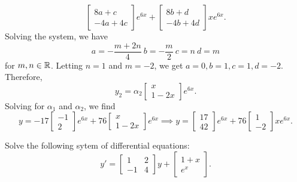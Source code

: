 \begin{example}
$$    \begin{bmatrix} 8a+c \\ -4a+4c \end{bmatrix}e^{6x} + \begin{bmatrix} 8b+d \\ -4b+4d \end{bmatrix}xe^{6x}.$$
    Solving the system, we have $$a=-\frac{m+2n}{4}~b=-\frac{m}{2}~c=n~d=m$$
    for $m,n \in \mathbb R$. Letting $n=1$ and $m=-2$, we get $a=0, b=1, c=1, d=-2$.
    Therefore, $$y_2 = \alpha_2 \begin{bmatrix} x \\ 1-2x \end{bmatrix}e^{6x}.$$
    Solving for $\alpha_1$ and $\alpha_2$, we find
    $$y = -17\begin{bmatrix} -1 \\ 2 \end{bmatrix}e^{6x}+76\begin{bmatrix} x \\ 1-2x \end{bmatrix}e^{6x}
    \implies y = \begin{bmatrix}17 \\42\end{bmatrix}e^{6x}+76\begin{bmatrix} 1\\ -2 \end{bmatrix}xe^{6x}.$$
\end{example}
\begin{exercise}
    Solve the following sytem of differential equations:
    $$y' = \begin{bmatrix} 1 & 2 \\ -1 & 4 \end{bmatrix}y + \begin{bmatrix} 1+x\\e^x \end{bmatrix}.$$
\end{exercise}
